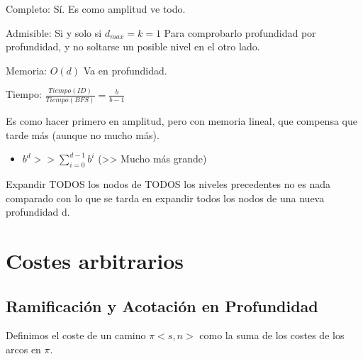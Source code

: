 \documentclass[12pt, twoside, openright]{report} %
\begin{document}
Completo: Sí. Es como amplitud ve todo.

Admisible: Si y solo si \(d_{max}=k=1\) Para comprobarlo profundidad
por profundidad, y no soltarse un posible nivel en el otro lado.

Memoria: \(O(d)\) Va en profundidad.

Tiempo: \(\frac {Tiempo (ID)} {Tiempo(BFS)} =\frac {b} {b-1}\)

Es como hacer primero en amplitud, pero con memoria lineal, que
compensa que tarde más (aunque no mucho más).

\begin{itemize}
	\item \(b^d >> \sum\limits_{i=0}^{d-1} b^i\) (\textgreater\textgreater{} Mucho
	      más grande)
\end{itemize}

Expandir TODOS los nodos de TODOS los niveles precedentes no es nada
comparado con lo que se tarda en expandir todos los nodos de una
nueva profundidad d.


\section{Costes arbitrarios}
\subsection{Ramificación y Acotación en Profundidad}


Definimos el coste de un camino \(\pi<s,n>\) como la suma de los
costes de los arcos en \(\pi\).
\end{document}
